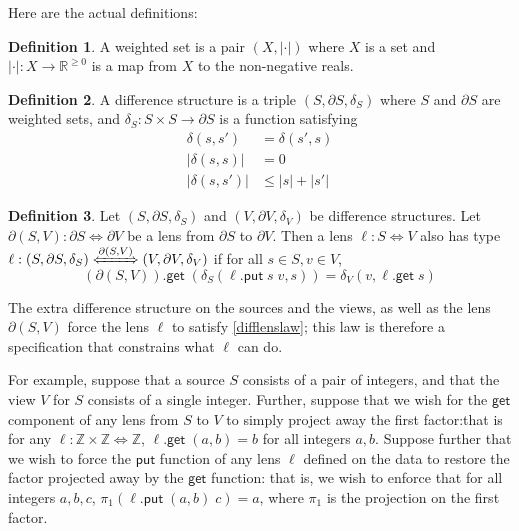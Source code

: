 \documentclass[acmsmall,review,anonymous]{acmart}\settopmatter{printfolios=true,printccs=false,printacmref=false}
\theoremstyle{definition}
\newtheorem{definition}{Definition}
\newcommand{\kw}[1]{\ensuremath{\mathsf{#1}}\xspace}
\newcommand{\get}{\ensuremath{\kw{get}}\xspace}
\newcommand{\pput}{\ensuremath{\kw{put}}\xspace}
\begin{document}
Here are the actual definitions:
\begin{definition}
A weighted set is a pair $(X, |\cdot|)$ where $X$ is a set and $|\cdot| : X
\longrightarrow \mathbb{R}^{\geq 0}$ is a map from $X$ to the non-negative
reals.
\end{definition}
\begin{definition}
A difference structure is a triple $(S, \partial S, \delta_S)$ where $S$ and
$\partial S$ are weighted sets, and $\delta_S:
S \times S \longrightarrow \partial S$ is a function satisfying
\begin{align*}
\delta(s, s') &= \delta(s', s)\tag{A1}\\
|\delta(s, s)| &= 0\tag{A2}\\
|\delta(s, s')| &\leq |s| + |s'|\tag{A3}
\end{align*}
\end{definition}
\begin{definition}
Let $(S, \partial S, \delta_S)$ and $(V, \partial V, \delta_V)$ be
difference structures. Let $\partial(S, V) : \partial S \Leftrightarrow \partial
V$ be a lens from $\partial S$ to $\partial V$. Then a lens $\ell : S
\Leftrightarrow V$ also has type $\ell : (S, \partial S,
\delta_S) \xLeftrightarrow{\partial(S, V)} (V, \partial V, \delta_V)$ if for
all $s \in S, v \in V$,
\begin{equation}\label{difflenslaw}
(\partial (S, V)).\get\; (\delta_S(\ell.\pput \; s \; v, s)) = \delta_V(v,
\ell.\get \; s)
\end{equation}
\end{definition}
The extra difference structure on the sources and the views, as well as the lens
$\partial(S, V)$ force the lens $\ell$ to satisfy \cref{difflenslaw}; this law is
therefore a specification that constrains what $\ell$ can do.

For example, suppose that a source $S$ consists of a pair of integers, and that the
view $V$ for $S$ consists of a single integer. Further, suppose that we wish
for the \get component of any lens from $S$ to $V$ to simply project away the
first factor:that is for any $\ell : \mathbb{Z} \times \mathbb{Z}
\Leftrightarrow \mathbb{Z}$, $\ell.\get \; (a, b) = b$ for all integers $a, b$.
Suppose further that we wish to force the \pput function of any lens $\ell$
defined on the data to restore the factor projected away by the \get function:
that is, we wish to enforce that for all integers $a, b, c$, $\pi_1(\ell.\pput
\; (a, b) \; c) = a$, where $\pi_1$ is the projection on the first factor.
\end{document}
